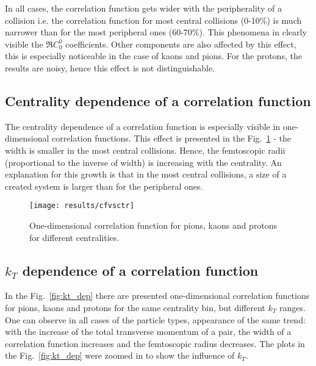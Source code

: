       In all cases, the correlation function gets wider with the peripherality of a collision i.e. the correlation function for most central collisions (0-10\%) is much narrower than for the most peripheral ones (60-70\%).
      This phenomena in clearly visible the $\Re C^0_0$ coefficients.
      Other components are also affected by this effect, this is especially noticeable in the case of kaons and pions.
      For the protons, the results are noisy, hence this effect is not distinguishable.


    \FloatBarrier
    \clearpage
    \subsection{Centrality dependence of a correlation function}
      The centrality dependence of a correlation function is especially visible in one-dimensional correlation functions.
      This effect is presented in the Fig.~\ref{fig:centr_dep} - the width is smaller in the most central collisions.
      Hence, the femtoscopic radii (proportional to the inverse of width) is increasing with the centrality.
      An explanation for this growth is that in the most central collisions, a size of a created system is larger than for the peripheral ones.
      \begin{figure}[h]
        \centering
        \centerline{\texttt{[image: results/cfvsctr]}}
        \caption{One-dimensional correlation function for pions, kaons and protons for different centralities.}
      \label{fig:centr_dep}
      \end{figure}
    \FloatBarrier
    \clearpage
    \subsection{$k_T$ dependence of a correlation function}
      In the Fig.~\ref{fig:kt_dep} there are presented one-dimensional correlation functions for pions, kaons and protons for the same centrality bin, but different $k_T$ ranges.
      One can observe in all cases of the particle types, appearance of the same trend: with the increase of the total transverse momentum of a pair, the width of a correlation function increases and the femtoscopic radius decreases.
      The plots in the Fig.~\ref{fig:kt_dep} were zoomed in to show the influence of $k_T$.

